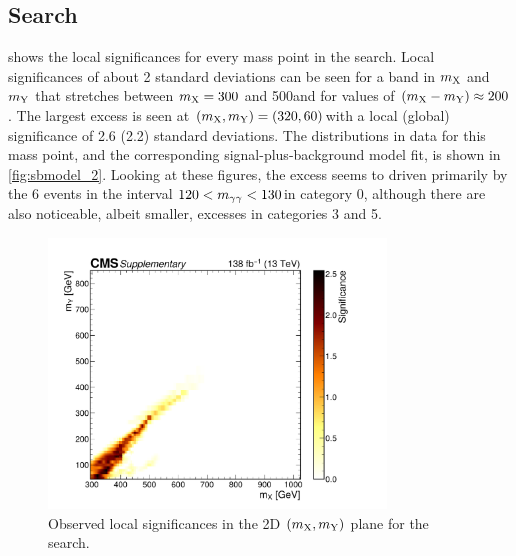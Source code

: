 \subsection[\texorpdfstring{\XYttHgg}{XY(gg)H(tt)} Search]{\XYttHgg Search}\label{sec:results_y_tautau}

 shows the local significances for every mass point in the \XYttHgg search. Local significances of about 2 standard deviations can be seen for a band in $m_{\mathrm{X}}$ and $m_{\mathrm{Y}}$ that stretches between $m_{\mathrm{X}}=300$ and 500\GeV and for values of $(m_{\mathrm{X}}-m_{\mathrm{Y}})\approx200$\GeV. The largest excess is seen at $(m_{\mathrm{X}},m_{\mathrm{Y}})=(320,60)$\GeV with a local (global) significance of 2.6 (2.2) standard deviations. The \mgg distributions in data for this mass point, and the corresponding signal-plus-background model fit, is shown in \cref{fig:sbmodel_2}. Looking at these figures, the excess seems to driven primarily by the 6 events in the interval $120 < m_{\gamma\gamma} < 130$\GeV in category 0, although there are also noticeable, albeit smaller, excesses in categories 3 and 5.

\begin{figure}
    \centering
    \includegraphics[width=0.8\textwidth]{Figures/Dihiggs/results/significances/significance_y_tautau_supplementary.pdf}
    \caption[\XYttHgg Observed Local Significances]{Observed local significances in the 2D $(m_{\mathrm{X}},m_{\mathrm{Y}})$ plane for the \XYttHgg search.}\label{fig:significance_y_tautau}
\end{figure}

